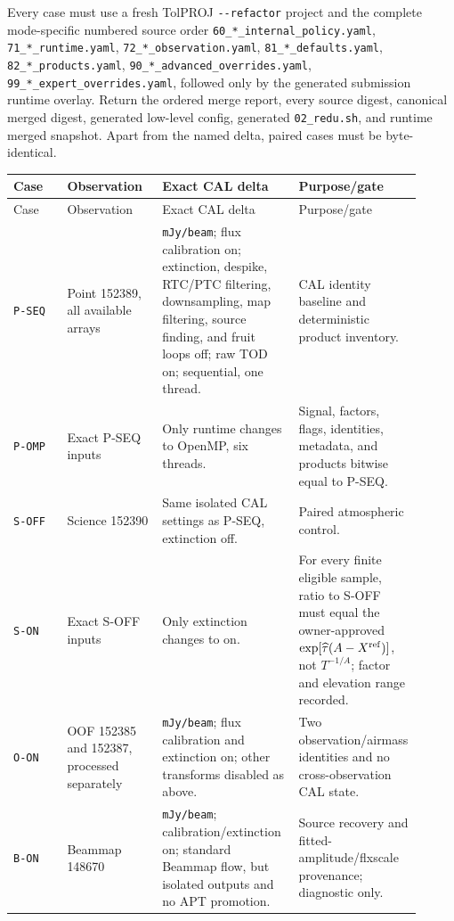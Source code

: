 \documentclass[11pt]{article}
\newcommand{\code}[1]{\nolinkurl{#1}}
\begin{document}
{\raggedright Every case must use a fresh TolPROJ \code{--refactor} project and the complete
mode-specific numbered source order
\code{60_*_internal_policy.yaml}, \code{71_*_runtime.yaml},
\code{72_*_observation.yaml}, \code{81_*_defaults.yaml},
\code{82_*_products.yaml}, \code{90_*_advanced_overrides.yaml},
\code{99_*_expert_overrides.yaml}, followed only by the generated submission
runtime overlay.  Return the ordered merge report, every source digest,
canonical merged digest, generated low-level config, generated
\code{02_redu.sh}, and runtime merged snapshot.  Apart from the named delta,
paired cases must be byte-identical.\par}

\begin{longtable}{L{0.13\linewidth}L{0.23\linewidth}L{0.33\linewidth}L{0.22\linewidth}}
\toprule
Case & Observation & Exact CAL delta & Purpose/gate\\
\midrule
\endfirsthead
\toprule
Case & Observation & Exact CAL delta & Purpose/gate\\
\midrule
\endhead
\code{P-SEQ} & Point 152389, all available arrays & \code{mJy/beam};
flux calibration on; extinction, despike, RTC/PTC filtering, downsampling,
map filtering, source finding, and fruit loops off; raw TOD on; sequential,
one thread. & CAL identity baseline and deterministic product inventory.\\
\code{P-OMP} & Exact P-SEQ inputs & Only runtime changes to OpenMP, six
threads. & Signal, factors, flags, identities, metadata, and products bitwise
equal to P-SEQ.\\
\code{S-OFF} & Science 152390 & Same isolated CAL settings as P-SEQ, extinction
off. & Paired atmospheric control.\\
\code{S-ON} & Exact S-OFF inputs & Only extinction changes to on. & For every
finite eligible sample, ratio to S-OFF must equal the owner-approved
\(\exp[\widehat\tau(A-X^{\rm ref})]\), not \(T^{-1/A}\); factor and elevation
range recorded.\\
\code{O-ON} & OOF 152385 and 152387, processed separately & \code{mJy/beam};
flux calibration and extinction on; other transforms disabled as above. &
Two observation/airmass identities and no cross-observation CAL state.\\
\code{B-ON} & Beammap 148670 & \code{mJy/beam}; calibration/extinction on;
standard Beammap flow, but isolated outputs and no APT promotion. & Source
recovery and fitted-amplitude/flxscale provenance; diagnostic only.\\

\end{longtable}
\end{document}

